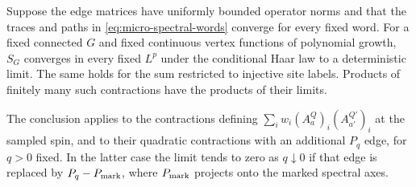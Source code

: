 \begin{lemma}
\label{lem:micro-contractions}
Suppose the edge matrices have uniformly bounded operator norms and that
the traces and paths in \eqref{eq:micro-spectral-words} converge for every
fixed word. For a fixed connected $G$ and fixed continuous vertex
functions of polynomial growth, $S_G$ converges in every fixed $L^p$
under the conditional Haar law to a deterministic limit. The same holds
for the sum restricted to injective site labels. Products of finitely
many such contractions have the products of their limits.

The conclusion applies to the contractions defining
$\sum_iw_i(A_a^Q)_i(A_{a'}^{Q'})_i$ at the sampled spin, and to their
quadratic contractions with an additional $P_q$ edge, for $q>0$ fixed.
In the latter case the limit tends to zero as $q\downarrow0$ if that edge
is replaced by $P_q-P_{\rm mark}$, where $P_{\rm mark}$ projects onto the
marked spectral axes.
\end{lemma}

